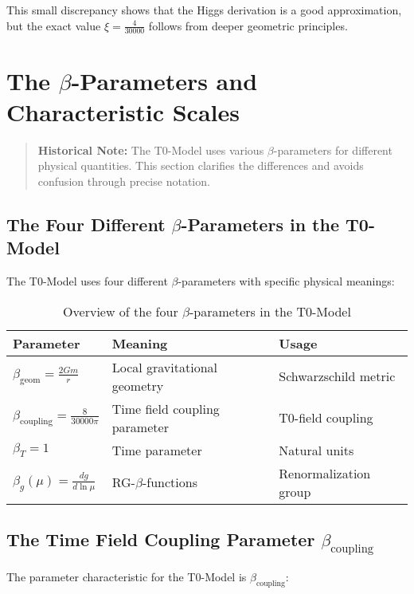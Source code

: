 \documentclass[12pt,a4paper]{report}
\newcommand{\xipar}{\xi}      %
\begin{document}
This small discrepancy shows that the Higgs derivation is a good approximation, but the exact value $\xipar = \frac{4}{30000}$ follows from deeper geometric principles.

\section{The $\beta$-Parameters and Characteristic Scales}\label{sec:beta_parameters}

\begin{quote}
	\textbf{Historical Note:} The T0-Model uses various $\beta$-parameters for different physical quantities. This section clarifies the differences and avoids confusion through precise notation.
\end{quote}

\subsection{The Four Different $\beta$-Parameters in the T0-Model}\label{subsec:four_beta_parameters}

The T0-Model uses four different $\beta$-parameters with specific physical meanings:

\begin{table}[h]
	\centering
	\begin{tabular}{|l|l|l|}
		\hline
		\textbf{Parameter} & \textbf{Meaning} & \textbf{Usage} \\
		\hline
		$\beta_{\text{geom}} = \frac{2Gm}{r}$ & Local gravitational geometry & Schwarzschild metric \\
		$\beta_{\text{coupling}} = \frac{8}{30000\pi}$ & Time field coupling parameter & T0-field coupling \\
		$\beta_T = 1$ & Time parameter & Natural units \\
		$\beta_g(\mu) = \frac{dg}{d\ln\mu}$ & RG-$\beta$-functions & Renormalization group \\
		\hline
	\end{tabular}
	\caption{Overview of the four $\beta$-parameters in the T0-Model}
\end{table}

\subsection{The Time Field Coupling Parameter $\beta_{\text{coupling}}$}\label{subsec:timefield_coupling_parameter}

The parameter characteristic for the T0-Model is $\beta_{\text{coupling}}$:
\end{document}
